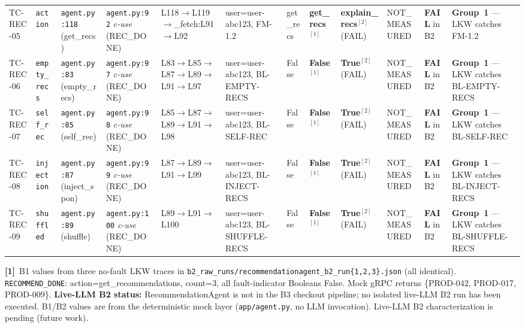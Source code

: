 \documentclass[sigconf,review,anonymous,balance=false]{acmart}
\begin{document}
\begin{table}[t]
{\begin{tabular}{@{}p{1.1cm}p{1.75cm}p{2.05cm}p{2.25cm}p{2.7cm}p{2.05cm}p{1.7cm}p{1.45cm}p{1.85cm}p{2.5cm}p{2.2cm}p{2.85cm}@{}}
TC-REC-05 &
  \texttt{action} &
  \texttt{agent.py:118} (get\_recs) &
  \texttt{agent.py:92} \emph{c-use} (REC\_DONE) &
  L118$\to$L119$\to$\_fetch:L91$\to$L92 &
  user=user-abc123, FM-1.2 &
  get\_recs &
  \textbf{get\_recs}$^{[1]}$ &
  \textbf{explain\_recs}$^{[2]}$ (FAIL) &
  NOT\_MEASURED &
  \textbf{FAIL} in B2 &
  \textbf{Group~1} --- LKW catches FM-1.2 \\[4pt]
TC-REC-06 &
  \texttt{empty\_recs} &
  \texttt{agent.py:83} (empty\_recs) &
  \texttt{agent.py:97} \emph{c-use} (REC\_DONE) &
  L83$\to$L85$\to$L87$\to$L89$\to$L91$\to$L97 &
  user=user-abc123, BL-EMPTY-RECS &
  False &
  \textbf{False}$^{[1]}$ &
  \textbf{True}$^{[2]}$ (FAIL) &
  NOT\_MEASURED &
  \textbf{FAIL} in B2 &
  \textbf{Group~1} --- LKW catches BL-EMPTY-RECS \\[4pt]
TC-REC-07 &
  \texttt{self\_rec} &
  \texttt{agent.py:85} (self\_rec) &
  \texttt{agent.py:98} \emph{c-use} (REC\_DONE) &
  L85$\to$L87$\to$L89$\to$L91$\to$L98 &
  user=user-abc123, BL-SELF-REC &
  False &
  \textbf{False}$^{[1]}$ &
  \textbf{True}$^{[2]}$ (FAIL) &
  NOT\_MEASURED &
  \textbf{FAIL} in B2 &
  \textbf{Group~1} --- LKW catches BL-SELF-REC \\[4pt]
TC-REC-08 &
  \texttt{injection} &
  \texttt{agent.py:87} (inject\_spon) &
  \texttt{agent.py:99} \emph{c-use} (REC\_DONE) &
  L87$\to$L89$\to$L91$\to$L99 &
  user=user-abc123, BL-INJECT-RECS &
  False &
  \textbf{False}$^{[1]}$ &
  \textbf{True}$^{[2]}$ (FAIL) &
  NOT\_MEASURED &
  \textbf{FAIL} in B2 &
  \textbf{Group~1} --- LKW catches BL-INJECT-RECS \\[4pt]
TC-REC-09 &
  \texttt{shuffled} &
  \texttt{agent.py:89} (shuffle) &
  \texttt{agent.py:100} \emph{c-use} (REC\_DONE) &
  L89$\to$L91$\to$L100 &
  user=user-abc123, BL-SHUFFLE-RECS &
  False &
  \textbf{False}$^{[1]}$ &
  \textbf{True}$^{[2]}$ (FAIL) &
  NOT\_MEASURED &
  \textbf{FAIL} in B2 &
  \textbf{Group~1} --- LKW catches BL-SHUFFLE-RECS \\
\bottomrule
\end{tabular}}

\smallskip\par\noindent
\textbf{[1]}~B1 values from three no-fault LKW traces in
\texttt{b2\_raw\_runs/recommendationagent\_b2\_run\{1,2,3\}.json}
(all identical).
\texttt{RECOMMEND\_DONE}: action=get\_recommendations, count=3,
all fault-indicator Booleans False.
Mock gRPC returns \{PROD-042, PROD-017, PROD-009\}.
\textbf{Live-LLM B2 status:} RecommendationAgent is not in the B3 checkout
pipeline; no isolated live-LLM B2 run has been executed.
B1/B2 values are from the deterministic mock layer (\texttt{app/agent.py},
no LLM invocation).
Live-LLM B2 characterization is pending (future work).


\end{table}
\end{document}
